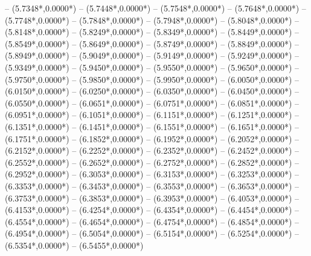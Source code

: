 {	-- ({5.7348*\dx},{0.0000*\dy})
	-- ({5.7448*\dx},{0.0000*\dy})
	-- ({5.7548*\dx},{0.0000*\dy})
	-- ({5.7648*\dx},{0.0000*\dy})
	-- ({5.7748*\dx},{0.0000*\dy})
	-- ({5.7848*\dx},{0.0000*\dy})
	-- ({5.7948*\dx},{0.0000*\dy})
	-- ({5.8048*\dx},{0.0000*\dy})
	-- ({5.8148*\dx},{0.0000*\dy})
	-- ({5.8249*\dx},{0.0000*\dy})
	-- ({5.8349*\dx},{0.0000*\dy})
	-- ({5.8449*\dx},{0.0000*\dy})
	-- ({5.8549*\dx},{0.0000*\dy})
	-- ({5.8649*\dx},{0.0000*\dy})
	-- ({5.8749*\dx},{0.0000*\dy})
	-- ({5.8849*\dx},{0.0000*\dy})
	-- ({5.8949*\dx},{0.0000*\dy})
	-- ({5.9049*\dx},{0.0000*\dy})
	-- ({5.9149*\dx},{0.0000*\dy})
	-- ({5.9249*\dx},{0.0000*\dy})
	-- ({5.9349*\dx},{0.0000*\dy})
	-- ({5.9450*\dx},{0.0000*\dy})
	-- ({5.9550*\dx},{0.0000*\dy})
	-- ({5.9650*\dx},{0.0000*\dy})
	-- ({5.9750*\dx},{0.0000*\dy})
	-- ({5.9850*\dx},{0.0000*\dy})
	-- ({5.9950*\dx},{0.0000*\dy})
	-- ({6.0050*\dx},{0.0000*\dy})
	-- ({6.0150*\dx},{0.0000*\dy})
	-- ({6.0250*\dx},{0.0000*\dy})
	-- ({6.0350*\dx},{0.0000*\dy})
	-- ({6.0450*\dx},{0.0000*\dy})
	-- ({6.0550*\dx},{0.0000*\dy})
	-- ({6.0651*\dx},{0.0000*\dy})
	-- ({6.0751*\dx},{0.0000*\dy})
	-- ({6.0851*\dx},{0.0000*\dy})
	-- ({6.0951*\dx},{0.0000*\dy})
	-- ({6.1051*\dx},{0.0000*\dy})
	-- ({6.1151*\dx},{0.0000*\dy})
	-- ({6.1251*\dx},{0.0000*\dy})
	-- ({6.1351*\dx},{0.0000*\dy})
	-- ({6.1451*\dx},{0.0000*\dy})
	-- ({6.1551*\dx},{0.0000*\dy})
	-- ({6.1651*\dx},{0.0000*\dy})
	-- ({6.1751*\dx},{0.0000*\dy})
	-- ({6.1852*\dx},{0.0000*\dy})
	-- ({6.1952*\dx},{0.0000*\dy})
	-- ({6.2052*\dx},{0.0000*\dy})
	-- ({6.2152*\dx},{0.0000*\dy})
	-- ({6.2252*\dx},{0.0000*\dy})
	-- ({6.2352*\dx},{0.0000*\dy})
	-- ({6.2452*\dx},{0.0000*\dy})
	-- ({6.2552*\dx},{0.0000*\dy})
	-- ({6.2652*\dx},{0.0000*\dy})
	-- ({6.2752*\dx},{0.0000*\dy})
	-- ({6.2852*\dx},{0.0000*\dy})
	-- ({6.2952*\dx},{0.0000*\dy})
	-- ({6.3053*\dx},{0.0000*\dy})
	-- ({6.3153*\dx},{0.0000*\dy})
	-- ({6.3253*\dx},{0.0000*\dy})
	-- ({6.3353*\dx},{0.0000*\dy})
	-- ({6.3453*\dx},{0.0000*\dy})
	-- ({6.3553*\dx},{0.0000*\dy})
	-- ({6.3653*\dx},{0.0000*\dy})
	-- ({6.3753*\dx},{0.0000*\dy})
	-- ({6.3853*\dx},{0.0000*\dy})
	-- ({6.3953*\dx},{0.0000*\dy})
	-- ({6.4053*\dx},{0.0000*\dy})
	-- ({6.4153*\dx},{0.0000*\dy})
	-- ({6.4254*\dx},{0.0000*\dy})
	-- ({6.4354*\dx},{0.0000*\dy})
	-- ({6.4454*\dx},{0.0000*\dy})
	-- ({6.4554*\dx},{0.0000*\dy})
	-- ({6.4654*\dx},{0.0000*\dy})
	-- ({6.4754*\dx},{0.0000*\dy})
	-- ({6.4854*\dx},{0.0000*\dy})
	-- ({6.4954*\dx},{0.0000*\dy})
	-- ({6.5054*\dx},{0.0000*\dy})
	-- ({6.5154*\dx},{0.0000*\dy})
	-- ({6.5254*\dx},{0.0000*\dy})
	-- ({6.5354*\dx},{0.0000*\dy})
	-- ({6.5455*\dx},{0.0000*\dy})
}
